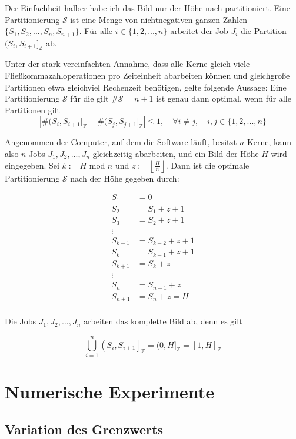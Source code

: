 \documentclass[a4paper, 11pt]{report}
\theoremstyle{definition}
\begin{document}
				Der Einfachheit halber habe ich das Bild nur der Höhe nach partitioniert. Eine Partitionierung $\mathcal{S}$ ist eine Menge von nichtnegativen ganzen Zahlen $\{S_1, S_2, ..., S_n, S_{n+1}\}$. Für alle $i \in \{1,2,...,n\}$ arbeitet der Job $J_i$ die Partition $(S_i, S_{i+1}]_\mathbb{Z}$ ab.

				Unter der stark vereinfachten Annahme, dass alle Kerne gleich viele Fließkommazahloperationen pro Zeiteinheit abarbeiten können und gleichgroße Partitionen etwa gleichviel Rechenzeit benötigen, gelte folgende Aussage: Eine Partitionierung $\mathcal{S}$ für die gilt $\#\mathcal{S} = n+1$ ist genau dann optimal, wenn für alle Partitionen gilt
				$$|\#(S_i, S_{i+1}]_\mathbb{Z} - \#(S_j, S_{j+1}]_\mathbb{Z}| \leq 1, \quad \forall i \neq j, \quad i,j \in \{1,2,...,n\}$$

				Angenommen der Computer, auf dem die Software läuft, besitzt $n$ Kerne, kann also $n$ Jobs $J_1,J_2,...,J_n$ gleichzeitig abarbeiten, und ein Bild der Höhe $H$ wird eingegeben. Sei $k := H \text{ mod } n$ und $z := \left\lfloor \frac{H}{n} \right\rfloor$. Dann ist die optimale Partitionierung $\mathcal{S}$ nach der Höhe gegeben durch:

				\begin{align*}
				S_1 	&= 					0		\\
				S_2 	&= S_1		+	z + 1		\\
				S_3 	&= S_2 		+ 	z + 1		\\
									\vdots			\\
				S_{k-1} &= S_{k-2}	+ 	z + 1		\\
				S_{k}	&= S_{k-1} 	+ 	z + 1		\\
				S_{k+1} &= S_k 		+ 	z			\\
									\vdots			\\
				S_{n} 	&= S_{n-1} 	+ 	z 			\\
				S_{n+1} &= S_{n}	+	z  = H	\\
				\end{align*}

				Die Jobs $J_1, J_2, ..., J_n$ arbeiten das komplette Bild ab, denn es gilt

				$$ \bigcup_{i=1}^n \left(S_i, S_{i+1}\right]_\mathbb{Z} = (0,H]_\mathbb{Z} = [1,H]_\mathbb{Z} $$

		
		\section{Numerische Experimente}
			\subsection{Variation des Grenzwerts}
\end{document}
